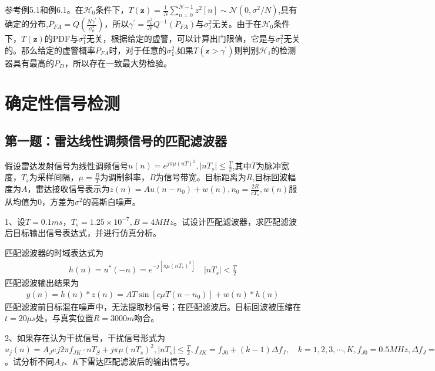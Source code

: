 \documentclass[fontset=windows]{article}
\numberwithin{figure}{section}
\begin{document}
参考例5.1和例6.1。在\(\mathcal{H}_0\)条件下，\(T(\mathbf{z})=\frac{1}{N}\sum_{n=0}^{N-1}z^2[n]\sim \mathcal{N}(0,\sigma^2/N)\),具有确定的分布,\(P_{FA}=Q(\frac{N\gamma^{\prime}}{\sigma_0^2})\)，所以\(\gamma^{\prime}=\frac{\sigma^2_0}{N}Q^{-1}(P_{FA})\)与\(\sigma_1^2\)无关。由于在\(\mathcal{H}_0\)条件下，\(T(\mathbf{z})\)的PDF与\(\sigma_1^2\)无关，根据给定的虚警，可以计算出门限值，它是与\(\sigma_1^2\)无关的。那么给定的虚警概率\(P_{FA}\)时，对于任意的\(\sigma_1^2\),如果\(T(\mathbf{z}>\gamma^{\prime})\)则判别\(\mathcal{H}_1\)的检测器具有最高的\(P_D\)，所以存在一致最大势检验。

\section{确定性信号检测}
\subsection{第一题：雷达线性调频信号的匹配滤波器}
假设雷达发射信号为线性调频信号\(u(n)=e^{j\pi \mu (nT)^2},|nT_s|\leqslant\frac{T}{2}\),其中\(T\)为脉冲宽度，\(T_s\)为采样间隔，\(\mu=\frac{B}{T}\)为调制斜率，\(B\)为信号带宽。目标距离为\(R\),目标回波幅度为\(A\)，雷达接收信号表示为\(z(n)=Au(n-n_0)+w(n),n_0=\frac{2R}{cT_s},w(n)\)服从均值为0，方差为\(\sigma^2\)的高斯白噪声。

1、设\(T=0.1ms，T_s=1.25\times 10^{-7},B=4MHz\)。试设计匹配滤波器，求匹配滤波后目标输出信号表达式，并进行仿真分析。

匹配滤波器的时域表达式为
\begin{align*}
	h(n)=u^*(-n)=e^{-j[\pi \mu (nT_s)^2]}\quad |nT_s|<\frac{T}{2}
\end{align*}
匹配滤波输出结果为
\begin{align*}
	y(n)=h(n)*z(n)=AT\sin\left[c\mu T(n-n_0)\right]+w(n)*h(n)
\end{align*}
匹配滤波前目标混在噪声中，无法提取秒信号；在匹配滤波后。目标回波被压缩在\(t=20\mu s\)处，与真实位置\(R=3000m\)吻合。

2、如果存在认为干扰信号，干扰信号形式为\(u_j(n)=A_Je^{}j2\pi f_{JK}\cdot nT_S+j\pi \mu(nT_s)^2,|nT_s|\leqslant\frac{T}{2},f_{JK}=f_{J0}+(k-1)\Delta f_J,\quad k=1,2,3,\cdots,K,f_{J0}=0.5MHz,\Delta f_J=0.4MHz\)。试分析不同\(A_J\)、\(K\)下雷达匹配滤波后的输出信号。
\end{document}
